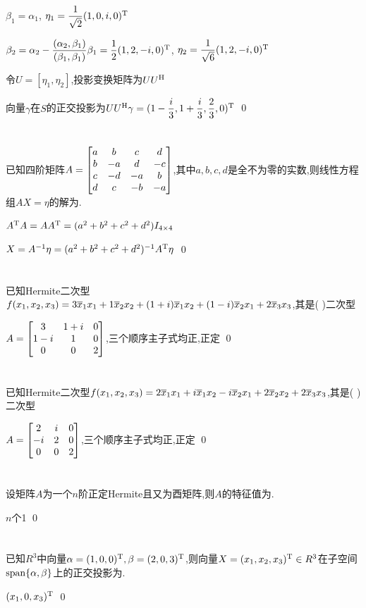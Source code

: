 \documentclass{matrix-homework}
\begin{document}
$\beta_1=\alpha_1$, $\eta_1=\dfrac{1}{\sqrt{2}}(1,0,i,0)^{\mathrm{T}}$

$\beta_2=\alpha_2-\dfrac{(\alpha_2,\beta_1)}{(\beta_1,\beta_1)}\beta_1= \dfrac{1}{2}(1,2,-i,0)^{\mathrm{T}}$, $\eta_2=\dfrac{1}{\sqrt{6}}(1,2,-i,0)^{\mathrm{T}}$

令$U=[\eta_1,\eta_2]$,投影变换矩阵为$UU^{\mathrm{H}}$

向量$\gamma$在$S$的正交投影为$UU^{\mathrm{H}}\gamma=(1-\dfrac{i}{3},1+\dfrac{i}{3},\dfrac{2}{3},0)^{\mathrm{T}}$
\qed


\section{}
已知四阶矩阵$A=\begin{bmatrix}a&b&c&d\\ b&-a&d&-c\\ c&-d&-a&b\\ d&c&-b&-a\end{bmatrix}$,其中$a,b,c,d$是全不为零的实数,则线性方程组$AX=\eta$的解为.

\answer
$A^{\mathrm{T}} A = AA^{\mathrm{T}} = (a^2+b^2+c^2+d^2)I_{4\times 4}$

$X=A^{-1}\eta=(a^2+b^2+c^2+d^2)^{-1}A^{\mathrm{T}}\eta$
\qed


\section{}
已知Hermite二次型$f(x_1,x_2,x_3)=3\overline{x}_{1}x_{1}+1\overline{x}_{2}x_{2}+(1+i)\overline{x}_{1}x_{2}+(1-i)\overline{x}_{2}x_{1}+2\overline{x}_{3}x_{3}$,其是( )二次型

\answer
$A=\begin{bmatrix}3&1+i&0\\1-i&1&0\\0&0&2\end{bmatrix}$,三个顺序主子式均正,正定
\qed


\section{}
已知Hermite二次型$f(x_1,x_2,x_3)=2\overline{x}_{1}x_{1}+i\overline{x}_{1}x_{2}-i\overline{x}_{2}x_{1}+2\overline{x}_{2}x_{2}+2\overline{x}_{3}x_{3}$,其是( )二次型

\answer
$A=\begin{bmatrix}2&i&0\\-i&2&0\\0&0&2\end{bmatrix}$,三个顺序主子式均正,正定
\qed


\section{}
设矩阵$A$为一个$n$阶正定Hermite且又为酉矩阵,则$A$的特征值为.

\answer
$n$个1
\qed


\section{}
已知$R^3$中向量$\alpha=(1,0,0)^{\mathrm{T}},\beta=(2,0,3)^{\mathrm{T}}$,则向量$X=(x_1,x_2,x_3)^{\mathrm{T}}\in R^3$在子空间$\mathrm{span}\{\alpha,\beta\}$上的正交投影为.

\answer
$(x_1,0,x_3)^{\mathrm{T}}$
\qed
\end{document}
